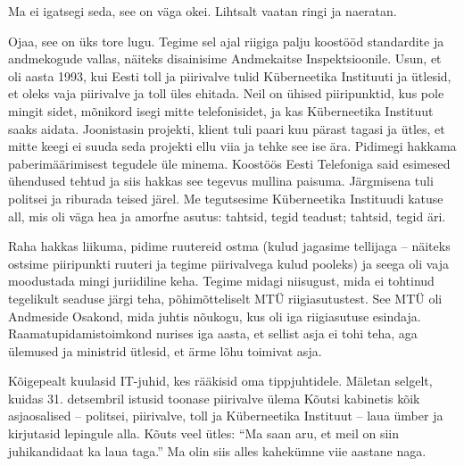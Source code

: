 
Ma ei igatsegi seda, see on väga okei. Lihtsalt vaatan 
ringi ja naeratan. 


Ojaa, see on üks tore lugu. Tegime sel ajal
riigiga palju koostööd standardite ja andmekogude 
vallas, näiteks disainisime Andmekaitse Inspektsioonile. 
Usun, et oli aasta 1993, kui Eesti toll ja piirivalve tulid Küberneetika Instituuti ja ütlesid, et 
oleks vaja piirivalve ja toll üles ehitada. Neil on 
ühised piiripunktid, kus pole mingit sidet, mõnikord isegi mitte 
telefonisidet, ja kas Küberneetika Instituut saaks aidata. 
Joonistasin projekti, klient tuli paari kuu pärast tagasi ja ütles, et mitte keegi ei 
suuda seda projekti ellu viia ja tehke see ise ära. 
Pidimegi hakkama paberimäärimisest tegudele üle minema. 
Koostöös Eesti Telefoniga 
said esimesed ühendused tehtud ja siis hakkas see tegevus mullina 
paisuma. Järgmisena tuli politsei ja riburada teised järel. Me 
tegutsesime Küberneetika Instituudi katuse all, mis oli väga hea ja
amorfne asutus: tahtsid, tegid teadust; tahtsid, tegid äri.

Raha hakkas liikuma, pidime ruutereid 
ostma (kulud jagasime tellijaga -- näiteks ostsime piiripunkti ruuteri ja tegime piirivalvega kulud pooleks) ja seega oli vaja moodustada mingi juriidiline keha. Tegime midagi niisugust, mida 
ei tohtinud tegelikult seaduse järgi teha, põhimõtteliselt MTÜ riigiasutustest. 
See MTÜ oli Andmeside Osakond, mida juhtis nõukogu, kus oli iga riigiasutuse esindaja.
Raamatupidamistoimkond nurises iga aasta, et sellist asja ei tohi teha, aga 
ülemused ja ministrid ütlesid, et ärme lõhu 
toimivat asja.


Kõigepealt kuulasid IT-juhid, kes rääkisid oma tippjuhtidele. 
Mäletan selgelt, kuidas 31. detsembril istusid toonase 
piirivalve ülema Kõutsi 
kabinetis kõik asjaosalised -- politsei, piirivalve, toll ja Küberneetika 
Instituut -- laua ümber ja kirjutasid lepingule alla. Kõuts veel ütles: \enquote{Ma saan aru, et meil on siin juhikandidaat ka laua taga.} Ma olin siis alles kahekümne viie aastane naga. 

